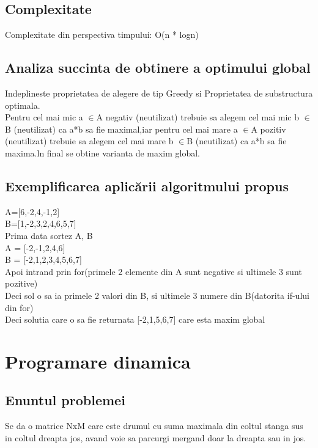 \documentclass[runningheads]{llncs}
\begin{document}
\subsection{Complexitate}
Complexitate din perspectiva timpului: O(n * logn)

\subsection{Analiza succinta de obtinere a optimului global}
Indeplineste proprietatea de alegere de tip Greedy si Proprietatea de substructura optimala.\\
Pentru cel mai mic a $ \in $A negativ (neutilizat) trebuie sa alegem cel mai mic b $ \in $B (neutilizat)
ca a*b sa fie maximal,iar pentru cel mai mare a $ \in $A pozitiv (neutilizat) trebuie sa alegem cel mai mare b $ \in $B (neutilizat)
ca a*b sa fie maxima.ln final se obtine varianta de maxim global.\\


\subsection{Exemplificarea aplicării algoritmului propus}
A=[6,-2,4,-1,2]\\
B=[1,-2,3,2,4,6,5,7]\\
Prima data sortez A, B\\
A = [-2,-1,2,4,6]\\
B = [-2,1,2,3,4,5,6,7]\\
Apoi intrand prin for(primele 2 elemente din A sunt negative si ultimele 3 sunt pozitive)\\
Deci sol o sa ia primele 2 valori din  B, si ultimele 3 numere din B(datorita if-ului din for)\\
Deci solutia care o sa fie returnata [-2,1,5,6,7] care esta maxim global\\



\newpage


\section{Programare dinamica }
\subsection{Enuntul problemei}
Se da o matrice NxM care este drumul cu suma maximala din coltul stanga sus in coltul dreapta jos, avand voie sa parcurgi mergand doar la dreapta sau in jos.
\end{document}
